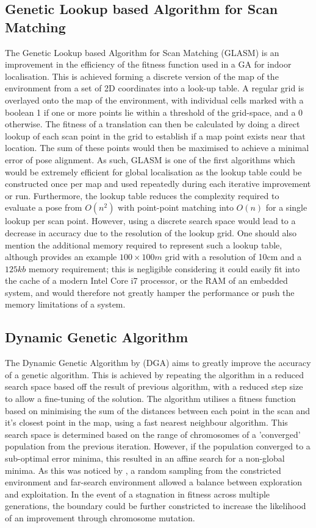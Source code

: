 \documentclass[authoryearcitations]{UoYCSproject}
\begin{document}
\subsection{Genetic Lookup based Algorithm for Scan Matching}
The Genetic Lookup based Algorithm for Scan Matching (GLASM) \cite{Lenac2007-xm} is an improvement in the efficiency of the fitness function used in a GA for indoor localisation. This is achieved forming a discrete version of the map of the environment from a set of 2D coordinates into a look-up table. A regular grid is overlayed onto the map of the environment, with individual cells marked with a boolean 1 if one or more points lie within a threshold of the grid-space, and a 0 otherwise. The fitness of a translation can then be calculated by doing a direct lookup of each scan point in the grid to establish if a map point exists near that location. The sum of these points would then be maximised to achieve a minimal error of pose alignment. As such, GLASM is one of the first algorithms which would be extremely efficient for global localisation as the lookup table could be constructed once per map and used repeatedly during each iterative improvement or run. Furthermore, the lookup table reduces the complexity required to evaluate a pose from $O(n^2)$ with point-point matching into $O(n)$ for a single lookup per scan point. However, using a discrete search space would lead to a decrease in accuracy due to the resolution of the lookup grid. One should also mention the additional memory required to represent such a lookup table, although \citeauthor{Lenac2007-xm} provides an example $100\times100m$ grid with a resolution of 10cm and a $125kb$ memory requirement; this is negligible considering it could easily fit into the cache of a modern Intel Core i7 processor, or the RAM of an embedded system, and would therefore not greatly hamper the performance or push the memory limitations of a system. 

\subsection{Dynamic Genetic Algorithm}
The Dynamic Genetic Algorithm by \citet{Chow2004-xc} (DGA) aims to greatly improve the accuracy of a genetic algorithm. This is achieved by repeating the algorithm in a reduced search space based off the result of previous algorithm, with a reduced step size to allow a fine-tuning of the solution. The algorithm utilises a fitness function based on minimising the sum of the distances between each point in the scan and it's closest point in the map, using a fast nearest neighbour algorithm. This search space is determined based on the range of chromosomes of a 'converged' population from the previous iteration. However, if the population converged to a sub-optimal error minima, this resulted in an affine search for a non-global minima. As this was noticed by \citeauthor{Chow2004-xc}, a random sampling from the constricted environment and far-search environment allowed a balance between exploration and exploitation. In the event of a stagnation in fitness across multiple generations, the boundary could be further constricted to increase the likelihood of an improvement through chromosome mutation. 
\end{document}
